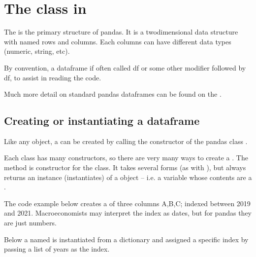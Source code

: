 \documentclass[letterpaper,10pt,english]{jupyterBook}
\begin{document}
\section{The  class in }
\label{\detokenize{content/04_PythonEssentials/PythonPandasDataframes:the-dataframe-class-in-pandas}}
\sphinxAtStartPar
The  is the primary structure of pandas. It is a two\sphinxhyphen{}dimensional data structure with named rows and columns.  Each columns can have different data types (numeric, string, etc).

\sphinxAtStartPar
By convention, a dataframe if often called df or some other modifier followed by df, to assist in reading the code.

\sphinxAtStartPar
Much more detail on standard pandas dataframes can be found on the .


\subsection{Creating or instantiating a dataframe}
\label{\detokenize{content/04_PythonEssentials/PythonPandasDataframes:creating-or-instantiating-a-dataframe}}
\sphinxAtStartPar
Like any object, a  can be created by calling the constructor of the pandas class .

\sphinxAtStartPar
Each class has many constructors, so there are very many ways to create a . The  method is constructor for the  class. It takes several forms (as with ), but always returns an instance (instantiates) of a  object – i.e. a variable whose contents are a .

\sphinxAtStartPar
The code example below creates a  of three columns A,B,C; indexed between 2019 and 2021.  Macroeconomists may interpret the index as dates, but for pandas they are just numbers.

\sphinxAtStartPar
Below a  named  is instantiated from a dictionary and assigned a specific index by passing a list of years as the index.
\end{document}
